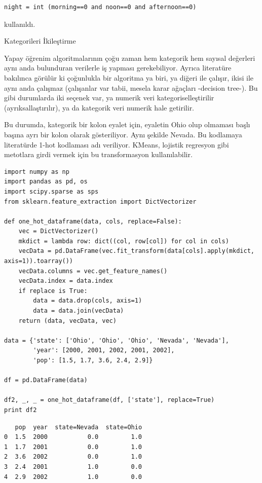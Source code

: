 \documentclass[12pt,fleqn]{article}\usepackage{../../common}
\begin{document}
\begin{verbatim}
night = int (morning==0 and noon==0 and afternoon==0)
\end{verbatim}

kullanıldı.

Kategorileri İkileştirme

Yapay öğrenim algoritmalarının çoğu zaman hem kategorik hem sayısal
değerleri aynı anda bulunduran verilerle iş yapması gerekebiliyor. Ayrıca
literatüre bakılınca görülür ki çoğunlukla bir algoritma ya biri, ya diğeri
ile çalışır, ikisi ile aynı anda çalışmaz (çalışanlar var tabii, mesela
karar ağaçları -decision tree-). Bu gibi durumlarda iki seçenek var, ya
numerik veri kategoriselleştirilir (ayrıksallaştırılır), ya da kategorik
veri numerik hale getirilir.

Bu durumda, kategorik bir kolon eyalet için, eyaletin Ohio olup olmaması
başlı başına ayrı bir kolon olarak gösteriliyor. Aynı şekilde Nevada. Bu
kodlamaya literatürde 1-hot kodlaması adı veriliyor. KMeans, lojistik
regresyon gibi metotlara girdi vermek için bu transformasyon
kullanılabilir.

\begin{verbatim}
import numpy as np
import pandas as pd, os
import scipy.sparse as sps
from sklearn.feature_extraction import DictVectorizer

def one_hot_dataframe(data, cols, replace=False):
    vec = DictVectorizer()
    mkdict = lambda row: dict((col, row[col]) for col in cols)
    vecData = pd.DataFrame(vec.fit_transform(data[cols].apply(mkdict, axis=1)).toarray())
    vecData.columns = vec.get_feature_names()
    vecData.index = data.index
    if replace is True:
        data = data.drop(cols, axis=1)
        data = data.join(vecData)
    return (data, vecData, vec)

data = {'state': ['Ohio', 'Ohio', 'Ohio', 'Nevada', 'Nevada'],
        'year': [2000, 2001, 2002, 2001, 2002],
        'pop': [1.5, 1.7, 3.6, 2.4, 2.9]}

df = pd.DataFrame(data)

df2, _, _ = one_hot_dataframe(df, ['state'], replace=True)
print df2
\end{verbatim}

\begin{verbatim}
   pop  year  state=Nevada  state=Ohio
0  1.5  2000           0.0         1.0
1  1.7  2001           0.0         1.0
2  3.6  2002           0.0         1.0
3  2.4  2001           1.0         0.0
4  2.9  2002           1.0         0.0
\end{verbatim}
\end{document}
